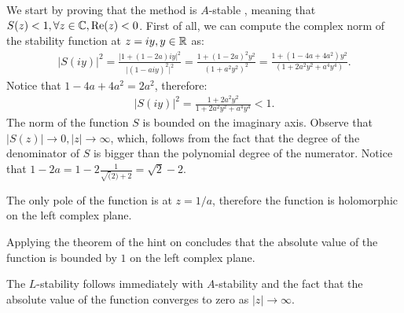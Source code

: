 \begin{problem}
\begin{subproblem}[4]
 \begin{solution}
  We start by proving that the method is $A$-stable , meaning that $S(z) < 1, \forall z \in \mathbb{C}, \mathrm{Re}(z) < 0$. First of all, we can compute the complex norm of the stability function at $z = iy, y \in \mathbb{R}$ as:
  \begin{align*}
   \lvert S(iy) \rvert^2 = \frac{\lvert 1 + (1-2a) iy \rvert^2}{\lvert(1 - a iy)^2 \rvert^2} = \frac{1+ (1-2a)^2y^2}{(1+ a^2 y^2)^2} = \frac{1+ (1-4a+4a^2)y^2}{(1+ 2a^2 y^2 + a^4 y^4)}.
  \end{align*}
  Notice that $1 - 4a + 4a^2 = 2a^2$, therefore:
  \begin{align*}
   \lvert S(iy) \rvert^2 = \frac{1+ 2 a^2 y^2}{1+ 2a^2 y^2 + a^4 y^4} < 1.
  \end{align*}
  The norm of the function $S$ is bounded on the imaginary axis. Observe that $\lvert S(z) \rvert \rightarrow 0, \lvert z \rvert \rightarrow \infty$, which, follows from the fact that the degree of the denominator of $S$ is bigger than the polynomial degree of the numerator.
  Notice that $1-2a = 1-2\frac{1}{\sqrt(2)+2} = \sqrt{2} - 2$.
  
  The only pole of the function is at $z = 1/a$, therefore the function is holomorphic on the left complex plane.
  
  Applying the theorem of the hint on concludes that the absolute value of the function is bounded by $1$ on the left complex plane.
  
  The $L$-stability follows immediately with $A$-stability and the fact that the absolute value of the function converges to zero as $\lvert z \rvert \rightarrow \infty$.
 \end{solution}
\end{subproblem}


 
\end{problem}
 